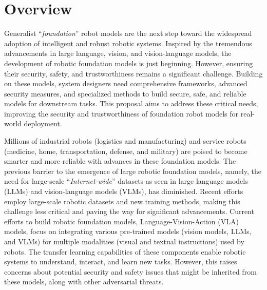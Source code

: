 \section{Overview}

Generalist ``\emph{foundation}'' robot models are the next step toward the widespread adoption of intelligent and robust robotic systems. 
Inspired by the tremendous advancements in large language, vision, and vision-language models, the development of robotic foundation models is just beginning. 
However, ensuring their security, safety, and trustworthiness remains a significant challenge. Building on these models, system designers need comprehensive frameworks, advanced security measures, and specialized methods to build secure, safe, and reliable models for downstream tasks. This proposal aims to address these critical needs, improving the security and trustworthiness of foundation robot models for real-world deployment. 

Millions of industrial robots (\eg logistics and manufacturing) and service robots (\eg medicine, home, transportation, defense, and military) are poised to become smarter and more reliable with advances in these foundation models. The previous barrier to the emergence of large robotic foundation models, namely, the need for large-scale ``\emph{Internet-wide}'' datasets as seen in large language models (LLMs) and vision-language models (VLMs), has diminished. Recent efforts employ large-scale \xot robotic datasets and new training methods, making this challenge less critical and paving the way for significant advancements.
Current efforts to build robotic foundation models, \eg Language-Vision-Action (VLA) models, focus on integrating various pre-trained models (\eg vision models, LLMs, and VLMs) for multiple modalities (\eg visual and textual instructions) used by robots. 
The transfer learning capabilities of these components enable robotic systems to understand, interact, and learn new tasks. However, this raises concerns about potential security and safety issues that might be inherited from these models, along with other adversarial threats.%

\vspace{-2ex}
\vspace{-3ex}

